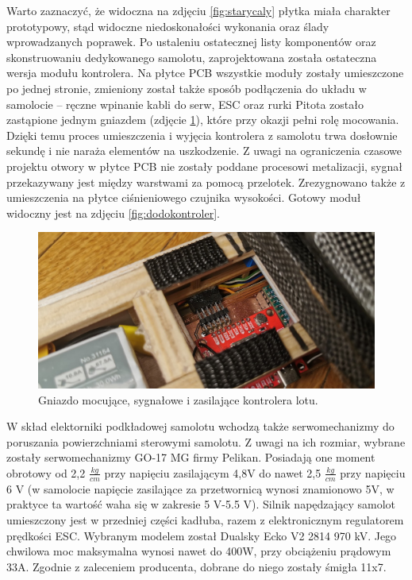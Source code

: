 \documentclass[12pt, a4paper]{article}
\begin{document}
Warto zaznaczyć, że widoczna na zdjęciu \ref{fig:starycaly} płytka miała charakter prototypowy, stąd widoczne niedoskonałości wykonania oraz ślady wprowadzanych poprawek. Po ustaleniu ostatecznej listy komponentów oraz skonstruowaniu dedykowanego samolotu, zaprojektowana została ostateczna wersja modułu kontrolera. Na płytce PCB wszystkie moduły zostały umieszczone po jednej stronie, zmieniony został także sposób podłączenia do układu w samolocie – ręczne wpinanie kabli do serw, ESC oraz rurki Pitota zostało zastąpione jednym gniazdem (zdjęcie \ref{fig:gniazdo}), które przy okazji pełni rolę mocowania. Dzięki temu proces umieszczenia i wyjęcia kontrolera z samolotu trwa dosłownie sekundę i nie naraża elementów na uszkodzenie. Z uwagi na ograniczenia czasowe projektu otwory w płytce PCB nie zostały poddane procesowi metalizacji, sygnał przekazywany jest między warstwami za pomocą przelotek. Zrezygnowano także z umieszczenia na płytce ciśnieniowego czujnika wysokości. Gotowy moduł widoczny jest na zdjęciu \ref{fig:dodokontroler}.

   \begin{figure}[ht]
    \centering
    \includegraphics[width=1\textwidth]{gniazdo}
    \caption{Gniazdo mocujące, sygnałowe i zasilające kontrolera lotu.}
    \label{fig:gniazdo}
\end{figure}


W skład elektorniki podkładowej samolotu wchodzą także serwomechanizmy do poruszania powierzchniami sterowymi samolotu. Z uwagi na ich rozmiar, wybrane zostały serwomechanizmy GO-17 MG firmy Pelikan. Posiadają one moment obrotowy od 2,2 $\frac{kg}{cm}$ przy napięciu zasilającym 4,8V do nawet 2,5 $\frac{kg}{cm}$ przy napięciu 6 V (w samolocie napięcie zasilające za przetwornicą wynosi znamionowo 5V, w praktyce ta wartość waha się w zakresie 5 V-5.5 V). Silnik napędzający samolot umieszczony jest w przedniej części kadłuba, razem z elektronicznym regulatorem prędkości ESC. Wybranym modelem został Dualsky Ecko V2 2814 970 kV. Jego chwilowa moc maksymalna wynosi nawet do 400W, przy obciążeniu prądowym 33A. Zgodnie z zaleceniem producenta, dobrane do niego zostały śmigła 11x7.  
\end{document}
